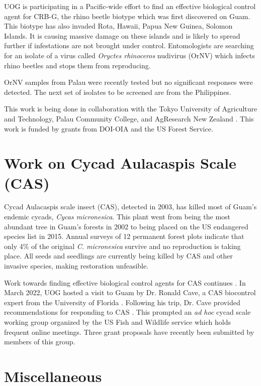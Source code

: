 \documentclass[twocolumn]{scrartcl}
\begin{document}
UOG is participating in a Pacific-wide effort to find an effective biological control agent for CRB-G, the rhino beetle biotype which was first discovered on Guam. This biotype has also invaded Rota, Hawaii, Papua New Guinea, Solomon Islands. It is causing massive damage on these islands and is likely to spread further if infestations are not brought under control. Entomologists are searching for an isolate of a virus called \textit{Oryctes rhinoceros} nudivirus (OrNV) which infects rhino beetles and stops them from reproducing.

OrNV samples from Palau were recently tested but no significant responses were detected. The next set of isolates to be screened are from the Philippines.

This work is being done in collaboration with the Tokyo University of Agriculture and Technology, Palau Community College, and AgResearch New Zealand \cite{hansonUOGTokyoUniversity}. This work is funded by grants from DOI-OIA and the US Forest Service.

\clearpage

\section{Work on Cycad Aulacaspis Scale (CAS)}

Cycad Aulacaspis scale insect (CAS), detected in 2003, has killed most of Guam’s endemic cycads, \textit{Cycas micronesica}. This plant went from being the
most abundant tree in Guam’s forests in 2002 to being placed on the US endangered species list in 2015. Annual surveys of 12 permanent forest
plots indicate that only 4\% of the original \textit{C. micronesica} survive and no reproduction is taking place. All seeds and seedlings are currently being killed by CAS and other invasive species, making restoration unfeasible. 

Work towards finding effective biological control agents for CAS continues \cite{caveBiologicalControlCycad2022}. In March 2022, UOG hosted a visit to Guam by Dr. Ronald Cave, a CAS biocontrol expert from the University of Florida \cite{caveBiologicalControlCycad2022a}. Following his trip, Dr. Cave provided recommendations for responding to CAS \cite{caveReportUSFish2022}. This prompted an \textit{ad hoc} cycad scale working group organized by the US Fish and Wildlife service which holds frequent online meetings. Three grant proposals have recently been submitted by members of this group.

\section{Miscellaneous}
\end{document}
